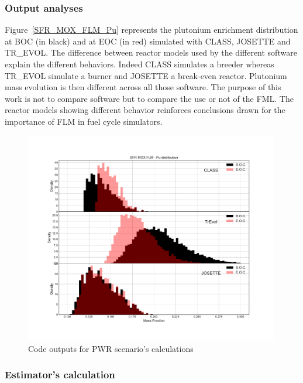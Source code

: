 \subsubsection{Output analyses}

Figure~\ref{SFR_MOX_FLM_Pu} represents the plutonium enrichment distribution at
BOC (in black) and at \gls{EOC} (in red) simulated with CLASS, JOSETTE and TR\_EVOL.
The difference between reactor models used by the different software explain the
different behaviors. Indeed CLASS simulates a breeder whereas TR\_EVOL simulate a
burner and JOSETTE a break-even reactor. Plutonium mass evolution is then
different across all those software. The purpose of this work is not to compare
software but to compare the use or not of the \gls{FML}. The reactor models
showing different behavior reinforces conclusions drawn for the importance of
\gls{FLM} in fuel cycle simulators.     

\begin{figure}[h]
	\begin{center}
		\includegraphics[width = 0.99\textwidth]{../../Feature_1/RAW_DATA/FIG/SFR_MOX_FLM_Pu.pdf}
		\caption{Code outputs for \gls{PWR} scenario's calculations}
		\label{fig:SFR_MOX_FLM_Pu}
	\end{center}
\end{figure}

\subsubsection{Estimator's calculation}
